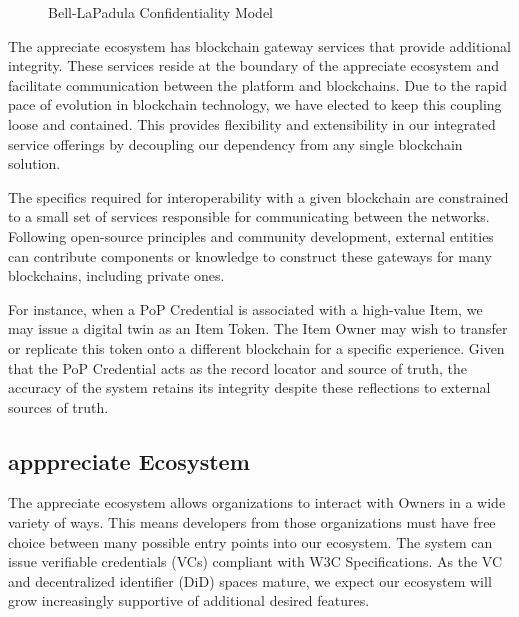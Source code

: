 \documentclass[a4paper,onecolumn, 10.5pt]{article}
\begin{document}
\begin{figure}[!htb]
	\centering %
	\caption{Bell-LaPadula Confidentiality Model}
	\label{fig: bella}
\end{figure}


The appreciate ecosystem has blockchain gateway services that provide additional integrity. These services reside at the boundary of the appreciate ecosystem and facilitate communication between the platform and blockchains. Due to the rapid pace of evolution in blockchain technology, we have elected to keep this coupling loose and contained. This provides flexibility and extensibility in our integrated service offerings by decoupling our dependency from any single blockchain solution.

The specifics required for interoperability with a given blockchain are constrained to a small set of services responsible for communicating between the networks. Following open-source principles and community development, external entities can contribute components or knowledge to construct these gateways for many blockchains, including private ones. 

For instance, when a PoP Credential is associated with a high-value Item, we may issue a digital twin as an Item Token\cite{nfts}. The Item Owner may wish to transfer or replicate this token onto a different blockchain for a specific experience. Given that the PoP Credential acts as the record locator and source of truth, the accuracy of the system retains its integrity despite these reflections to external sources of truth.



\subsection{apppreciate Ecosystem}

The appreciate ecosystem allows organizations to interact with Owners in a wide variety of ways. This means developers from those organizations must have free choice between many possible entry points into our ecosystem. The system can issue verifiable credentials (VCs) compliant with W3C Specifications\cite{verifiablecred}. As the VC and decentralized identifier (DiD) spaces mature, we expect our ecosystem will grow increasingly supportive of additional desired features.
\end{document}
